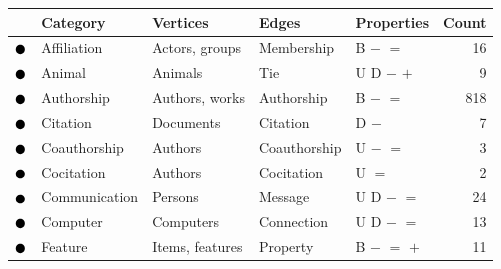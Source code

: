 \begin{tabular}{lllllr}
\toprule
& \textbf{Category} & \textbf{Vertices} & \textbf{Edges} & \textbf{Properties} & \textbf{Count} \\
\midrule
\textcolor{colorAffiliation}{$\newmoon$} &Affiliation & Actors, groups & Membership & \phantom{U} \phantom{D} B $-$ $=$ \phantom{$+$} \phantom{$\pm$} \phantom{$\stackrel{+}{=}$} \phantom{$*$} \phantom{$_*{}^*$} \phantom{$\rightleftharpoons$} \phantom{$++$}  &  16\\
\textcolor{colorAnimal}{$\newmoon$} &Animal & Animals & Tie & U D \phantom{B} $-$ \phantom{$=$} $+$ \phantom{$\pm$} \phantom{$\stackrel{+}{=}$} \phantom{$*$} \phantom{$_*{}^*$} \phantom{$\rightleftharpoons$} \phantom{$++$}  &  9\\
\textcolor{colorAuthorship}{$\newmoon$} &Authorship & Authors, works & Authorship & \phantom{U} \phantom{D} B $-$ $=$ \phantom{$+$} \phantom{$\pm$} \phantom{$\stackrel{+}{=}$} \phantom{$*$} \phantom{$_*{}^*$} \phantom{$\rightleftharpoons$} \phantom{$++$}  &  818\\
\textcolor{colorCitation}{$\newmoon$} &Citation & Documents & Citation & \phantom{U} D \phantom{B} $-$ \phantom{$=$} \phantom{$+$} \phantom{$\pm$} \phantom{$\stackrel{+}{=}$} \phantom{$*$} \phantom{$_*{}^*$} \phantom{$\rightleftharpoons$} \phantom{$++$}  &  7\\
\textcolor{colorCoauthorship}{$\newmoon$} &Coauthorship & Authors & Coauthorship & U \phantom{D} \phantom{B} $-$ $=$ \phantom{$+$} \phantom{$\pm$} \phantom{$\stackrel{+}{=}$} \phantom{$*$} \phantom{$_*{}^*$} \phantom{$\rightleftharpoons$} \phantom{$++$}  &  3\\
\textcolor{colorCocitation}{$\newmoon$} &Cocitation & Authors & Cocitation & U \phantom{D} \phantom{B} \phantom{$-$} $=$ \phantom{$+$} \phantom{$\pm$} \phantom{$\stackrel{+}{=}$} \phantom{$*$} \phantom{$_*{}^*$} \phantom{$\rightleftharpoons$} \phantom{$++$}  &  2\\
\textcolor{colorCommunication}{$\newmoon$} &Communication & Persons & Message & U D \phantom{B} $-$ $=$ \phantom{$+$} \phantom{$\pm$} \phantom{$\stackrel{+}{=}$} \phantom{$*$} \phantom{$_*{}^*$} \phantom{$\rightleftharpoons$} \phantom{$++$}  &  24\\
\textcolor{colorComputer}{$\newmoon$} &Computer & Computers & Connection & U D \phantom{B} $-$ $=$ \phantom{$+$} \phantom{$\pm$} \phantom{$\stackrel{+}{=}$} \phantom{$*$} \phantom{$_*{}^*$} \phantom{$\rightleftharpoons$} \phantom{$++$}  &  13\\
\textcolor{colorFeature}{$\newmoon$} &Feature & Items, features & Property & \phantom{U} \phantom{D} B $-$ $=$ $+$ \phantom{$\pm$} \phantom{$\stackrel{+}{=}$} \phantom{$*$} \phantom{$_*{}^*$} \phantom{$\rightleftharpoons$} \phantom{$++$}  &  11\\

\end{tabular}
